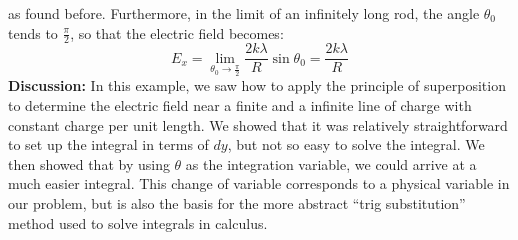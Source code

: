 \begin{framed}
\begin{framed}
as found before. Furthermore, in the limit of an infinitely long rod, the angle $\theta_0$ tends to $\frac{\pi}{2}$, so that the electric field becomes:
\begin{equation}
E_x=\lim_{\theta_0\to\frac{\pi}{2}}\frac{2k\lambda}{R}\sin\theta_0=\frac{2k\lambda}{R}
\end{equation}
\textbf{Discussion:} In this example, we saw how to apply the principle of superposition to determine the electric field near a finite and a infinite line of charge with constant charge per unit length. We showed that it was relatively straightforward to set up the integral in terms of $dy$, but not so easy to solve the integral. We then showed that by using $\theta$ as the integration variable, we could arrive at a much easier integral. This change of variable corresponds to a physical variable in our problem, but is also the basis for the more abstract ``trig substitution'' method used to solve integrals in calculus.
\end{framed}
\end{framed}

